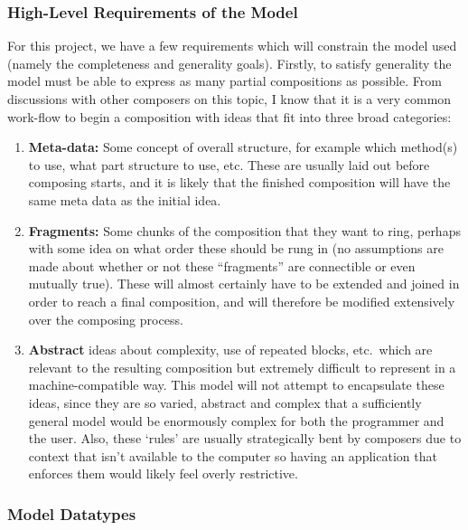 \documentclass[12pt]{article}
\begin{document}
\subsubsection{High-Level Requirements of the Model}

For this project, we have a few requirements which will constrain the model used (namely the
completeness and generality goals).  Firstly, to satisfy generality the model must be able to
express as many partial compositions as possible.  From discussions with other composers on this
topic, I know that it is a very common work-flow to begin a composition with ideas that fit into
three broad categories:

\begin{enumerate}
    \item \textbf{Meta-data:} Some concept of overall structure, for example which method(s) to use,
        what part structure to use, etc.  These are usually laid out before composing starts, and
        it is likely that the finished composition will have the same meta data as the initial idea.
    \item \textbf{Fragments:} Some chunks of the composition that they want to ring, perhaps with
        some idea on what order these should be rung in (no assumptions are made about whether or
        not these ``fragments'' are connectible or even mutually true).  These will almost certainly
        have to be extended and joined in order to reach a final composition, and will therefore be
        modified extensively over the composing process.
    \item \textbf{Abstract} ideas about complexity, use of repeated blocks, etc.\ which are
        relevant to the resulting composition but extremely difficult to represent in a
        machine-compatible way.  This model will not attempt to encapsulate these ideas, since they
        are so varied, abstract and complex that a sufficiently general model would be enormously
        complex for both the programmer and the user.  Also, these `rules' are usually strategically
        bent by composers due to context that isn't available to the computer so having an
        application that enforces them would likely feel overly restrictive.
\end{enumerate}

\subsubsection{Model Datatypes}
\end{document}
